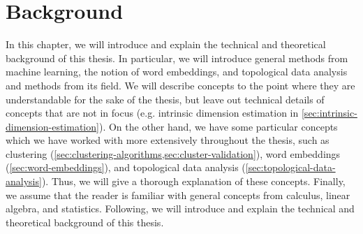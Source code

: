 \chapter{Background}
\label{chap:background}
In this chapter, we will introduce and explain the technical and theoretical background of this thesis. In particular, we will introduce general methods from machine learning, the notion of word embeddings, and topological data analysis and methods from its field. We will describe concepts to the point where they are understandable for the sake of the thesis, but leave out technical details of concepts that are not in focus (e.g. intrinsic dimension estimation in \cref{sec:intrinsic-dimension-estimation}). On the other hand, we have some particular concepts which we have worked with more extensively throughout the thesis, such as clustering (\cref{sec:clustering-algorithms,sec:cluster-validation}), word embeddings (\cref{sec:word-embeddings}), and topological data analysis (\cref{sec:topological-data-analysis}). Thus, we will give a thorough explanation of these concepts. Finally, we assume that the reader is familiar with general concepts from calculus, linear algebra, and statistics. Following, we will introduce and explain the technical and theoretical background of this thesis.



